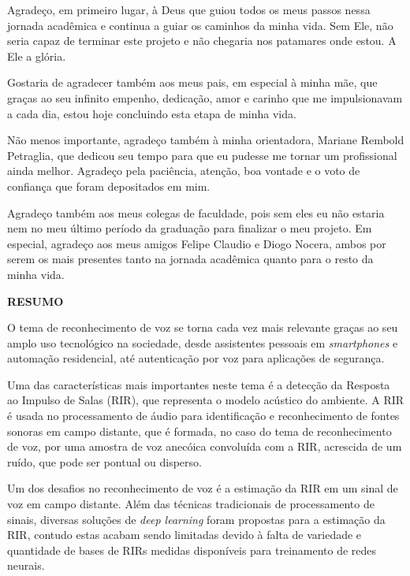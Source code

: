 Agradeço, em primeiro lugar, à Deus que guiou todos os meus passos nessa jornada acadêmica e continua a guiar os caminhos da minha vida.
Sem Ele, não seria capaz de terminar este projeto e não chegaria nos patamares onde estou. A Ele a glória.

Gostaria de agradecer também aos meus pais, em especial à minha mãe, que graças ao seu infinito empenho, dedicação, amor e carinho que me impulsionavam
a cada dia, estou hoje concluindo esta etapa de minha vida.

Não menos importante, agradeço também à minha orientadora, Mariane Rembold Petraglia, que dedicou seu tempo para que eu pudesse me tornar um profissional
ainda melhor. Agradeço pela paciência, atenção, boa vontade e o voto de confiança que foram depositados em mim.

Agradeço também aos meus colegas de faculdade, pois sem eles eu não estaria nem no meu último período da graduação para finalizar o meu projeto.
Em especial, agradeço aos meus amigos Felipe Claudio e Diogo Nocera, ambos por serem os mais presentes tanto na jornada acadêmica quanto para 
o resto da minha vida.

\pagebreak

\begin{center}
\textbf{RESUMO}
\end{center}
      \vspace{0.5cm}

O tema de reconhecimento de voz se torna cada vez mais relevante graças ao seu amplo uso tecnológico na sociedade, desde 
assistentes pessoais em \textit{smartphones} e automação residencial, até autenticação por voz para aplicações de segurança.

Uma das características mais importantes neste tema é a detecção da Resposta ao Impulso de Salas (RIR), que representa
o modelo acústico do ambiente. A RIR é usada no processamento de áudio para identificação e reconhecimento de fontes sonoras em campo
distante, que é formada, no caso do tema de reconhecimento de voz, por uma amostra de voz anecóica convoluída com a RIR, acrescida de um ruído,
que pode ser pontual ou disperso.

Um dos desafios no reconhecimento de voz é a estimação da RIR em um sinal de voz em campo distante.
Além das técnicas tradicionais de processamento de sinais, diversas soluções de \textit{deep learning} foram propostas para a estimação da RIR,
contudo estas acabam sendo limitadas devido à falta de variedade e quantidade de bases de RIRs medidas
disponíveis para treinamento de redes neurais.

